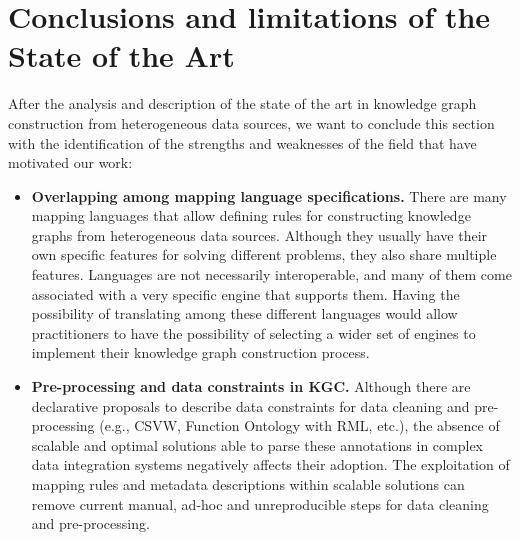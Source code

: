 \section{Conclusions and limitations of the State of the Art}
\label{sec:soa_conclusions}
After the analysis and description of the state of the art in knowledge graph construction from heterogeneous data sources, we want to conclude this section with the identification of the strengths and weaknesses of the field that have motivated our work:
\begin{itemize}
    \item \textbf{Overlapping among mapping language specifications.} There are many mapping languages that allow defining rules for constructing knowledge graphs from heterogeneous data sources. Although they usually have their own specific features for solving different problems, they also share multiple features. Languages are not necessarily interoperable, and many of them come associated with a very specific engine that supports them. Having the possibility of translating among these different languages would allow practitioners to have the possibility of selecting a wider set of engines to implement their knowledge graph construction process.
    \item \textbf{Pre-processing and data constraints in KGC.} Although there are declarative proposals to describe data constraints for data cleaning and pre-processing (e.g., CSVW, Function Ontology with RML, etc.), the absence of scalable and optimal solutions able to parse these annotations in complex data integration systems negatively affects their adoption. The exploitation of mapping rules and metadata descriptions within scalable solutions can remove current manual, ad-hoc and unreproducible steps for data cleaning and pre-processing.  

\end{itemize}

